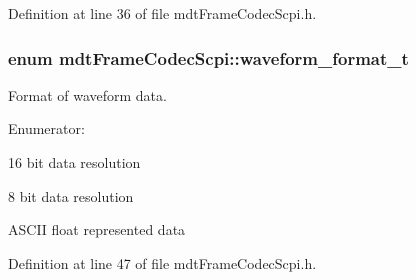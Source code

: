 Definition at line 36 of file mdtFrameCodecScpi.h.

\hypertarget{classmdt_frame_codec_scpi_a0562eccf33d8cf62e7a73a748a70c475}{
\subsubsection[{waveform\_\-format\_\-t}]{\setlength{\rightskip}{0pt plus 5cm}enum {\bf mdtFrameCodecScpi::waveform\_\-format\_\-t}}}
\label{classmdt_frame_codec_scpi_a0562eccf33d8cf62e7a73a748a70c475}


Format of waveform data. 

\begin{Desc}
\item[Enumerator: ]\par
\begin{description}
\item[{\em 
\hypertarget{classmdt_frame_codec_scpi_a0562eccf33d8cf62e7a73a748a70c475a7f4b47afe74504dea43bb04c8c6fbe58}{
WORD}
\label{classmdt_frame_codec_scpi_a0562eccf33d8cf62e7a73a748a70c475a7f4b47afe74504dea43bb04c8c6fbe58}
}]16 bit data resolution \item[{\em 
\hypertarget{classmdt_frame_codec_scpi_a0562eccf33d8cf62e7a73a748a70c475aad91226f87cea7fab38f5cc7618f424c}{
BYTE}
\label{classmdt_frame_codec_scpi_a0562eccf33d8cf62e7a73a748a70c475aad91226f87cea7fab38f5cc7618f424c}
}]8 bit data resolution \item[{\em 
\hypertarget{classmdt_frame_codec_scpi_a0562eccf33d8cf62e7a73a748a70c475a957445cd510a5c4e6964e9b79e73af4d}{
ASCII}
\label{classmdt_frame_codec_scpi_a0562eccf33d8cf62e7a73a748a70c475a957445cd510a5c4e6964e9b79e73af4d}
}]ASCII float represented data \end{description}
\end{Desc}



Definition at line 47 of file mdtFrameCodecScpi.h.




